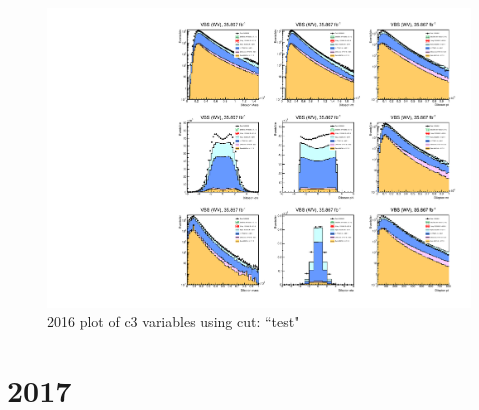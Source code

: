 \documentclass{article}
\begin{document}
            \begin{figure}[H]
                \centering
                \caption{2016 plot of c3 variables using cut: ``test"}
                \includegraphics[width=\textwidth]{2016/c3_2016_test.pdf}
            \end{figure}
    \section*{2017}
\end{document}
